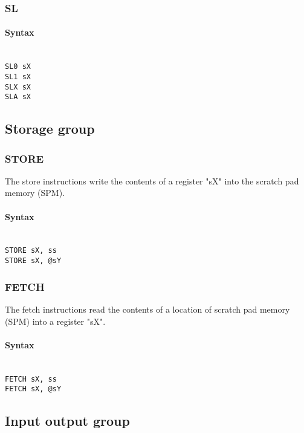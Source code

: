         \subsubsection{SL}
            \paragraph{Syntax}
                ~\\
                \verb'SL0 sX'\\
                \verb'SL1 sX'\\
                \verb'SLX sX'\\
                \verb'SLA sX'

    \subsection{Storage group}
        \subsubsection{STORE}
            The store instructions write the contents of a register "sX" into the scratch pad memory (SPM).

            \paragraph{Syntax}
                ~\\
                \verb'STORE sX, ss'\\
                \verb'STORE sX, @sY'

        \subsubsection{FETCH}
            The fetch instructions read the contents of a location of scratch pad memory (SPM) into a register "sX".

            \paragraph{Syntax}
                ~\\
                \verb'FETCH sX, ss'\\
                \verb'FETCH sX, @sY'

    \subsection{Input output group}
